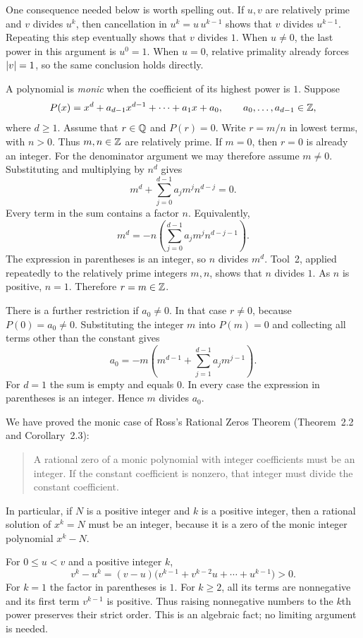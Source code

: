 One consequence needed below is worth spelling out. If $u,v$ are
relatively prime and $v$ divides $u^k$, then cancellation in
$u^k=u\,u^{k-1}$ shows that $v$ divides $u^{k-1}$. Repeating this step
eventually shows that $v$ divides $1$. When $u\ne0$, the last power in
this argument is $u^0=1$. When $u=0$, relative primality already forces
$\left|v\right|=1$, so the same conclusion holds directly.

A polynomial is \emph{monic} when the coefficient of its highest power
is $1$. Suppose
\[
 P(x)=x^d+a_{d-1}x^{d-1}+\cdots+a_1x+a_0,
 \qquad a_0,\ldots,a_{d-1}\in\mathbb{Z},
\]
where $d\ge1$. Assume that $r\in\mathbb{Q}$ and $P(r)=0$. Write
$r=m/n$ in lowest terms, with $n>0$. Thus $m,n\in\mathbb{Z}$ are relatively
prime. If $m=0$, then $r=0$ is already an integer. For the denominator
argument we may therefore assume $m\ne0$. Substituting and multiplying
by $n^d$ gives
\[
 m^d+\sum_{j=0}^{d-1}a_jm^j n^{d-j}=0.
\]
Every term in the sum contains a factor $n$. Equivalently,
\[
 m^d=-n\left(\sum_{j=0}^{d-1}a_jm^j n^{d-j-1}\right).
\]
The expression in parentheses is an integer, so $n$ divides $m^d$.
Tool~2, applied repeatedly to the relatively prime integers $m,n$,
shows that $n$ divides $1$. As $n$ is positive, $n=1$. Therefore
$r=m\in\mathbb{Z}$.

There is a further restriction if $a_0\ne0$. In that case $r\ne0$,
because $P(0)=a_0\ne0$. Substituting the integer $m$ into $P(m)=0$
and collecting all terms other than the constant gives
\[
 a_0=-m\left(m^{d-1}+\sum_{j=1}^{d-1}a_jm^{j-1}\right).
\]
For $d=1$ the sum is empty and equals $0$. In every case the expression
in parentheses is an integer. Hence $m$ divides $a_0$.

We have proved the monic case of Ross's Rational Zeros Theorem
(Theorem~2.2 and Corollary~2.3):
\begin{quote}
A rational zero of a monic polynomial with integer coefficients must
be an integer. If the constant coefficient is nonzero, that integer
must divide the constant coefficient.
\end{quote}
In particular, if $N$ is a positive integer and $k$ is a positive integer,
then a rational solution of $x^k=N$ must be an integer, because it is
a zero of the monic integer polynomial $x^k-N$.

For $0\le u<v$ and a positive integer $k$,
\[
 v^k-u^k=(v-u)
 \bigl(v^{k-1}+v^{k-2}u+\cdots+u^{k-1}\bigr)>0.
\]
For $k=1$ the factor in parentheses is $1$. For $k\ge2$, all its
terms are nonnegative and its first term $v^{k-1}$ is positive.
Thus raising nonnegative numbers to the $k$th power preserves their
strict order. This is an algebraic fact; no limiting argument is needed.

